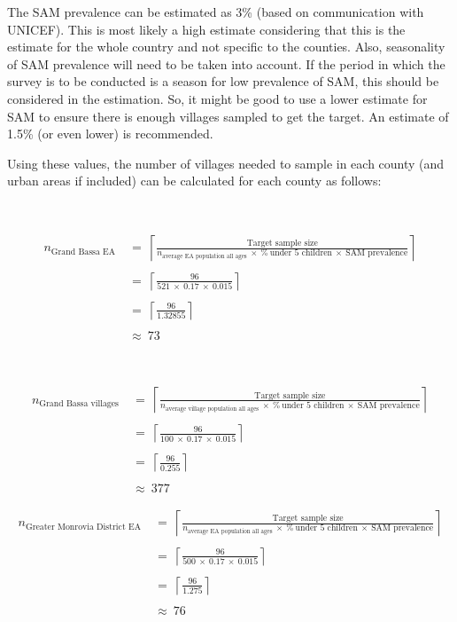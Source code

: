 \documentclass[12pt,a4paper]{book}
\theoremstyle{definition}
\theoremstyle{definition}
\theoremstyle{definition}
\theoremstyle{remark}
\begin{document}
The SAM prevalence can be estimated as 3\% (based on communication with
UNICEF). This is most likely a high estimate considering that this is
the estimate for the whole country and not specific to the counties.
Also, seasonality of SAM prevalence will need to be taken into account.
If the period in which the survey is to be conducted is a season for low
prevalence of SAM, this should be considered in the estimation. So, it
might be good to use a lower estimate for SAM to ensure there is enough
villages sampled to get the target. An estimate of 1.5\% (or even lower)
is recommended.

Using these values, the number of villages needed to sample in each
county (and urban areas if included) can be calculated for each county
as follows:

~

\[\begin{aligned} 
n_{\text{Grand Bassa EA}} & ~ = ~ \left \lceil \frac{\text{Target sample size}}{n_{\text{average EA population all ages}} ~ \times ~ \% ~ \text{under 5 children} ~ \times ~ \text{SAM prevalence}} \right \rceil \\
\\
& ~ = ~ \left \lceil \frac{96}{521 ~ \times ~ 0.17 ~ \times ~ 0.015} \right \rceil \\
\\
& ~ = ~ \left \lceil \frac{96}{1.32855} \right \rceil \\
\\
& ~ \approx ~ 73
\end{aligned}\]

~

\[\begin{aligned} 
n_{\text{Grand Bassa villages}} & ~ = ~ \left \lceil \frac{\text{Target sample size}}{n_{\text{average village population all ages}} ~ \times ~ \% ~ \text{under 5 children} ~ \times ~ \text{SAM prevalence}} \right \rceil \\
\\
& ~ = ~ \left \lceil \frac{96}{100 ~ \times ~ 0.17 ~ \times ~ 0.015} \right \rceil \\
\\
& ~ = ~ \left \lceil \frac{96}{0.255} \right \rceil \\
\\
& ~ \approx ~ 377
\end{aligned}\]

\newpage

\[\begin{aligned} 
n_{\text{Greater Monrovia District EA}} & ~ = ~ \left \lceil \frac{\text{Target sample size}}{n_{\text{average EA population all ages}} ~ \times ~ \% ~ \text{under 5 children} ~ \times ~ \text{SAM prevalence}} \right \rceil \\
\\
& ~ = ~ \left \lceil \frac{96}{500 ~ \times ~ 0.17 ~ \times ~ 0.015} \right \rceil \\
\\
& ~ = ~ \left \lceil \frac{96}{1.275} \right \rceil \\
\\
& ~ \approx ~ 76
\end{aligned}\]
\end{document}
